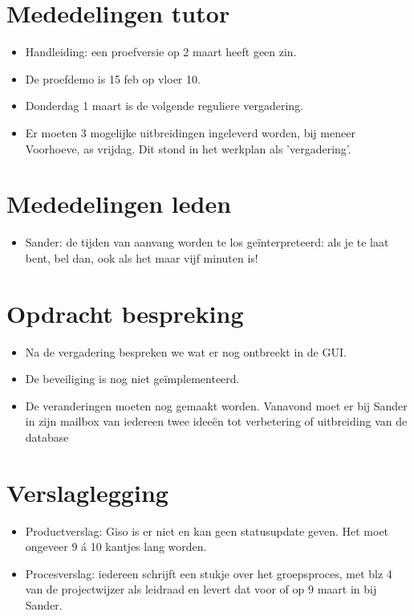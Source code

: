 \documentclass[]{article}
\begin{document}
\section{Mededelingen tutor}

    \begin{itemize}
        \item Handleiding: een proefversie op 2 maart heeft geen zin.
        \item De proefdemo is 15 feb op vloer 10.
        \item Donderdag 1 maart is de volgende reguliere vergadering.
        \item Er moeten 3 mogelijke uitbreidingen ingeleverd worden, bij meneer Voorhoeve, as vrijdag. Dit stond in het werkplan als 'vergadering'.
    \end{itemize}

\section{Mededelingen leden}

\begin{itemize}
   \item Sander: de tijden van aanvang worden te los ge\"interpreteerd: als je te laat bent, bel dan, ook als het maar vijf minuten is!
\end{itemize}

\section{Opdracht bespreking}

\begin{itemize}
    \item Na de vergadering bespreken we wat er nog ontbreekt in de GUI.
    \item De beveiliging is nog niet ge\"implementeerd.
    \item De veranderingen moeten nog gemaakt worden. Vanavond moet er bij Sander in zijn mailbox van iedereen twee idee\"en tot verbetering of uitbreiding van de database
\end{itemize}

\section{Verslaglegging}

\begin{itemize}
   \item Productverslag: Giso is er niet en kan geen statusupdate geven. Het moet ongeveer 9 \'a 10 kantjes lang worden.
   \item Procesverslag: iedereen schrijft een stukje over het groepsproces, met blz 4 van de projectwijzer als leidraad en levert dat voor of op 9 maart in bij Sander.
\end{itemize}
\end{document}
